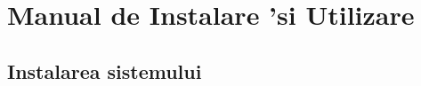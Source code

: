 \documentclass[12pt,a4paper,twoside]{report}
\begin{document}



\chapter{Manual de Instalare 'si Utilizare}

\section{Instalarea sistemului}
\end{document}
